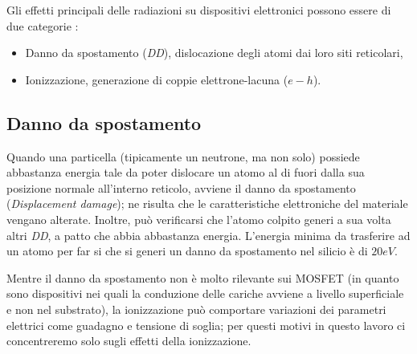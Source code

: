 
Gli effetti principali delle radiazioni su dispositivi elettronici possono essere di due categorie \cite{bib:Effetti_Radiazioni_1987}:
\begin{itemize}
	\item Danno da spostamento {(\textit{DD})}, dislocazione degli atomi dai loro siti reticolari,
	\item Ionizzazione, generazione di coppie elettrone-lacuna ($e-h$).
\end{itemize}

\subsection{Danno da spostamento}
Quando una particella (tipicamente un neutrone, ma non solo) possiede abbastanza energia tale da poter dislocare un atomo al di fuori dalla sua posizione normale all'interno reticolo, avviene il danno da spostamento (\textit{Displacement damage}); ne risulta che le caratteristiche elettroniche del materiale vengano alterate.
Inoltre, può verificarsi che l'atomo colpito generi a sua volta altri \textit{DD}, a patto che abbia abbastanza energia. L'energia minima da trasferire ad un atomo per far si che si generi un danno da spostamento nel silicio è di $20 eV$.


\vspace*{0.5cm}

Mentre il danno da spostamento non è molto rilevante sui MOSFET (in quanto sono dispositivi nei quali la conduzione delle cariche avviene a livello superficiale e non nel substrato), la ionizzazione può comportare variazioni dei parametri elettrici come guadagno e tensione di soglia; per questi motivi in questo lavoro ci concentreremo solo sugli effetti della ionizzazione.

 

